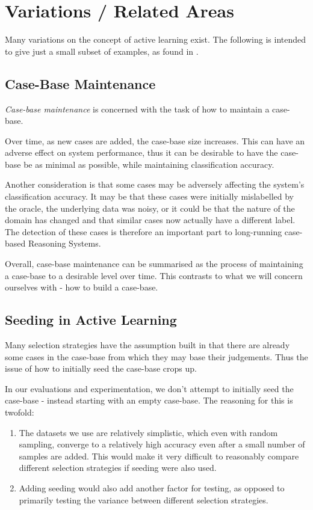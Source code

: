 \documentclass[a4paper,11pt]{report}
\begin{document}
\section{Variations / Related Areas}
Many variations on the concept of active learning exist. The following is intended to give just a small subset of examples, as found in \citet{Settles2010}.

\subsection{Case-Base Maintenance}
\emph{Case-base maintenance} is concerned with the task of how to maintain a case-base. 

Over time, as new cases are added, the case-base size increases. This can have an adverse effect on system performance, thus it can be desirable to have the case-base be as minimal as possible, while maintaining classification accuracy.

Another consideration is that some cases may be adversely affecting the system's classification accuracy. It may be that these cases were initially mislabelled by the oracle, the underlying data was noisy, or it could be that the nature of the domain has changed and that similar cases now actually have a different label. The detection of these cases is therefore an important part to long-running case-based Reasoning Systems.

Overall, case-base maintenance can be summarised as the process of maintaining a case-base to a desirable level over time. This contrasts to what we will concern ourselves with - how to build a case-base.

\subsection{Seeding in Active Learning}
Many selection strategies have the assumption built in that there are already some cases in the case-base from which they may base their judgements. Thus the issue of how to initially seed the case-base crops up.

In our evaluations and experimentation, we don't attempt to initially seed the case-base - instead starting with an empty case-base. The reasoning for this is twofold: 
\begin{enumerate}
	\item The datasets we use are relatively simplistic, which even with random sampling, converge to a relatively high accuracy even after a small number of samples are added. This would make it very difficult to reasonably compare different selection strategies if seeding were also used. 
	\item Adding seeding would also add another factor for testing, as opposed to primarily testing the variance between different selection strategies.
\end{enumerate}
\end{document}
